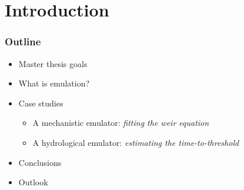 \documentclass[xcolor=dvipsnames, USenglish]{beamer}  %
\begin{document}
\section{Introduction}

  \begin{frame}
    \frametitle{Outline}
    \begin{itemize}
      \item Master thesis goals
      \item What is emulation?
      \item Case studies
      \begin{itemize}
        \item A mechanistic emulator: \emph{fitting the weir equation}
        \item A hydrological emulator: \emph{estimating the time-to-threshold}
      \end{itemize}
      \item Conclusions
      \item Outlook
     \end{itemize}
  \end{frame}

\end{document}
